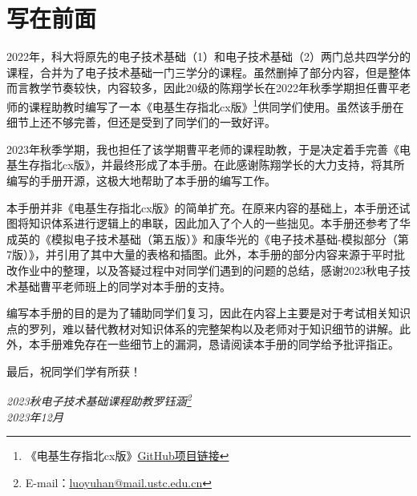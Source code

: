 \chapter*{写在前面}
2022年，科大将原先的电子技术基础（1）和电子技术基础（2）两门总共四学分的课程，合并为了电子技术基础一门三学分的课程。虽然删掉了部分内容，但是整体而言教学节奏较快，内容较多，因此20级的陈翔学长在2022年秋季学期担任曹平老师的课程助教时编写了一本《电基生存指北cx版》\footnote{《电基生存指北cx版》\href{https://github.com/Anony-Minor/Dianji_zhibei-guidance}{GitHub项目链接}}供同学们使用。虽然该手册在细节上还不够完善，但还是受到了同学们的一致好评。

2023年秋季学期，我也担任了该学期曹平老师的课程助教，于是决定着手完善《电基生存指北cx版》，并最终形成了本手册。在此感谢陈翔学长的大力支持，将其所编写的手册开源，这极大地帮助了本手册的编写工作。

本手册并非《电基生存指北cx版》的简单扩充。在原来内容的基础上，本手册还试图将知识体系进行逻辑上的串联，因此加入了个人的一些拙见。本手册还参考了华成英的《模拟电子技术基础（第五版）》和康华光的《电子技术基础-模拟部分（第7版）》，并引用了其中大量的表格和插图。此外，本手册的部分内容来源于平时批改作业中的整理，以及答疑过程中对同学们遇到的问题的总结，感谢2023秋电子技术基础曹平老师班上的同学对本手册的支持。

编写本手册的目的是为了辅助同学们复习，因此在内容上主要是对于考试相关知识点的罗列，难以替代教材对知识体系的完整架构以及老师对于知识细节的讲解。此外，本手册难免存在一些细节上的漏洞，恳请阅读本手册的同学给予批评指正。

最后，祝同学们学有所获！

\begin{flushright}
    \textsl{2023秋电子技术基础课程助教\quad 罗钰涵\footnote{E-mail：\href{mailto:luoyuhan@mail.ustc.edu.cn}{luoyuhan@mail.ustc.edu.cn}}\\2023年12月}
\end{flushright}




